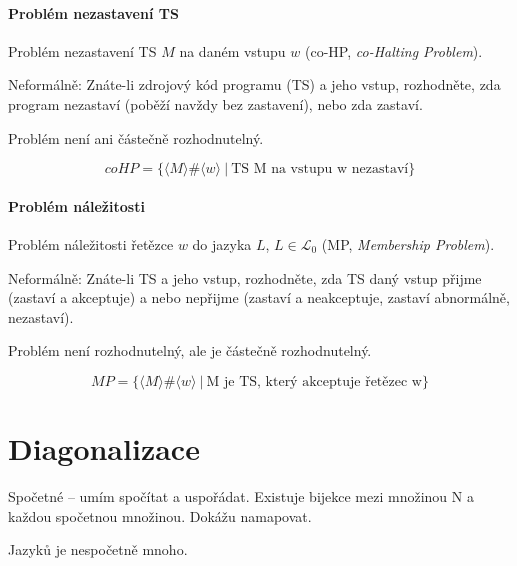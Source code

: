 \paragraph*{Problém nezastavení TS} \begin{compactitem}
    \item Problém nezastavení TS $M$ na daném vstupu $w$ (co-HP, \textit{co-Halting Problem}).

    \item Neformálně: Znáte-li zdrojový kód programu (TS) a jeho vstup, rozhodněte, zda program nezastaví (poběží navždy bez zastavení), nebo zda zastaví.

    \item Problém není ani částečně rozhodnutelný.
\end{compactitem}

$$ coHP = \{ \langle M \rangle \# \langle w \rangle ~|~ \text{TS M na vstupu w nezastaví} \} $$

\paragraph*{Problém náležitosti} \begin{compactitem}
    \item Problém náležitosti řetězce $w$ do jazyka $L$, $L \in \mathcal{L}_0$ (MP, \textit{Membership Problem}).

    \item Neformálně: Znáte-li TS a jeho vstup, rozhodněte, zda TS daný vstup přijme (zastaví a akceptuje) a nebo nepřijme (zastaví a neakceptuje, zastaví abnormálně, nezastaví).

    \item Problém není rozhodnutelný, ale je částečně rozhodnutelný.
\end{compactitem}

$$ MP = \{ \langle M \rangle \# \langle w \rangle ~|~ \text{M je TS, který akceptuje řetězec w} \} $$


\section{Diagonalizace}

Spočetné -- umím spočítat a uspořádat. Existuje bijekce mezi množinou N a každou spočetnou množinou. Dokážu namapovat.

Jazyků je nespočetně mnoho.

